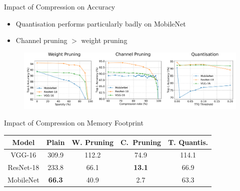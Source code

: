 \documentclass[xcolor=dvipsnames]{beamer}
\begin{document}
\begin{frame}{Impact of Compression on Accuracy}

\begin{itemize}
    \item Quantisation performs particularly badly on MobileNet
    \item Channel pruning $>$ weight pruning
\end{itemize}
    
\vspace{0.5cm}
\begin{figure}
    \centering
    \includegraphics[width=1.08\linewidth]{images/accuracies.pdf}
\end{figure}
    
\end{frame}

\begin{frame}{Impact of Compression on Memory Footprint}
    
\begin{table}[h]
\begin{center}

\begin{tabular}{ |c|c|c|c|c| } \hline
Model&Plain&W. Pruning &C.~Pruning&T. Quantis.\\ \hline \hline
VGG-16 	  &	309.9	& 112.2	& 74.9	& 114.1 \\ \hline
ResNet-18 &	233.8	& 66.1	& {\color{red}\textbf{13.1}}	& 66.9 \\ \hline
MobileNet & {\color{red}\textbf{66.3}} & 40.9	& 2.7	& 63.3 \\ \hline
\end{tabular}
\label{table:mem-90}
\end{center}
\end{table}

\end{frame}
\end{document}
